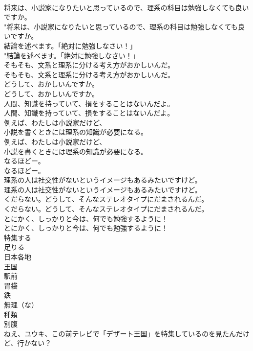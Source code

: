\documentclass[8pt]{extreport}
\begin{document}
\begin{CJK}{UTF8}{min}
\\	将来は、小説家になりたいと思っているので、理系の科目は勉強しなくても良いですか。	
\\	"将来は、小説家になりたいと思っているので、理系の科目は勉強しなくても良いですか。 
\\	結論を述べます。「絶対に勉強しなさい！」	
\\	"結論を述べます。「絶対に勉強しなさい！」 
\\	そもそも、文系と理系に分ける考え方がおかしいんだ。	
\\	そもそも、文系と理系に分ける考え方がおかしいんだ。 
\\	どうして、おかしいんですか。	
\\	どうして、おかしいんですか。 
\\	人間、知識を持っていて、損をすることはないんだよ。	
\\	人間、知識を持っていて、損をすることはないんだよ。 
\\	例えば、わたしは小説家だけど、
\\	小説を書くときには理系の知識が必要になる。	
\\	例えば、わたしは小説家だけど、
\\	小説を書くときには理系の知識が必要になる。 
\\	なるほどー。	
\\	なるほどー。 
\\	理系の人は社交性がないというイメージもあるみたいですけど。	
\\	理系の人は社交性がないというイメージもあるみたいですけど。 
\\	くだらない。どうして、そんなステレオタイプにだまされるんだ。	
\\	くだらない。どうして、そんなステレオタイプにだまされるんだ。 
\\	とにかく、しっかりと今は、何でも勉強するように！	
\\	とにかく、しっかりと今は、何でも勉強するように！ 
\\	特集する
\\	足りる
\\	日本各地
\\	王国
\\	駅前
\\	胃袋
\\	鉄
\\	無理（な）
\\	種類
\\	別腹
\\	ねえ、ユウキ、この前テレビで「デザート王国」を特集しているのを見たんだけど、行かない？	

\end{CJK}
\end{document}
